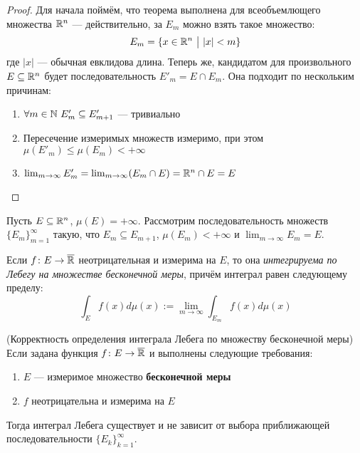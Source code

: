 \begin{proof}
	Для начала поймём, что теорема выполнена для всеобъемлющего множества $\mathbb{R}^n$ --- действительно, за $E_m$ можно взять такое множество:
	\[
		E_m = \{x \in \mathbb{R}^n \ \big|\  |x| < m\}
	\]
	где $|x|$ --- обычная евклидова длина. Теперь же, кандидатом для произвольного $E \subseteq \mathbb{R}^n$ будет последовательность $E'_m = E \cap E_m$. Она подходит по нескольким причинам:
	\begin{enumerate}
		\item $\forall m \in \mathbb{N}\ E'_m \subseteq E'_{m + 1}$ --- тривиально
		
		\item Пересечение измеримых множеств измеримо, при этом $\mu(E'_m) \le \mu(E_m) < +\infty$
		
		\item $\lim_{m \to \infty} E'_m = \lim_{m \to \infty} (E_m \cap E) = \mathbb{R}^n \cap E = E$
	\end{enumerate}
\end{proof}

\begin{definition}
	Пусть $E \subseteq \mathbb{R}^n$, $\mu(E) = +\infty$. Рассмотрим последовательность множеств $\{E_m\}_{m = 1}^\infty$ такую, что $E_m \subseteq E_{m + 1}$, $\mu(E_m) < +\infty$ и $\lim_{m \to \infty} E_m = E$.
	
	Если $f \colon E \to \overline{\mathbb{R}}$ неотрицательная и измерима на $E$, то она \textit{интегрируема по Лебегу на множестве бесконечной меры}, причём интеграл равен следующему пределу:
	\[
		\int_E f(x)d\mu(x) := \lim_{m \to \infty} \int_{E_m} f(x)d\mu(x)
	\]
\end{definition}

\begin{theorem} (Корректность определения интеграла Лебега по множеству бесконечной меры)
	Если задана функция $f \colon E \to \overline{\mathbb{R}}$ и выполнены следующие требования:
	\begin{enumerate}
		\item $E$ --- измеримое множество \textbf{бесконечной меры}
		
		\item $f$ неотрицательна и измерима на $E$
	\end{enumerate}
	Тогда интеграл Лебега существует и не зависит от выбора приближающей последовательности $\{E_k\}_{k = 1}^\infty$.
\end{theorem}

